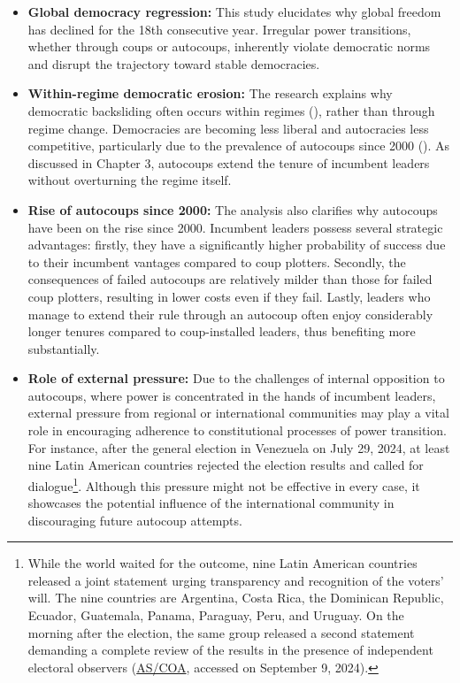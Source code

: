\documentclass[
  12pt,
]{report}
\begin{document}
\begin{itemize}
\item
  \textbf{Global democracy regression:} This study elucidates why global
  freedom has declined for the 18th consecutive year. Irregular power
  transitions, whether through coups or autocoups, inherently violate
  democratic norms and disrupt the trajectory toward stable democracies.
\item
  \textbf{Within-regime democratic erosion:} The research explains why
  democratic backsliding often occurs within regimes
  (),
  rather than through regime change. Democracies are becoming less
  liberal and autocracies less competitive, particularly due to the
  prevalence of autocoups since 2000 (). As discussed in Chapter 3, autocoups extend the tenure of
  incumbent leaders without overturning the regime itself.
\item
  \textbf{Rise of autocoups since 2000:} The analysis also clarifies why
  autocoups have been on the rise since 2000. Incumbent leaders possess
  several strategic advantages: firstly, they have a significantly
  higher probability of success due to their incumbent vantages compared
  to coup plotters. Secondly, the consequences of failed autocoups are
  relatively milder than those for failed coup plotters, resulting in
  lower costs even if they fail. Lastly, leaders who manage to extend
  their rule through an autocoup often enjoy considerably longer tenures
  compared to coup-installed leaders, thus benefiting more
  substantially.
\item
  \textbf{Role of external pressure:} Due to the challenges of internal
  opposition to autocoups, where power is concentrated in the hands of
  incumbent leaders, external pressure from regional or international
  communities may play a vital role in encouraging adherence to
  constitutional processes of power transition. For instance, after the
  general election in Venezuela on July 29, 2024, at least nine Latin
  American countries rejected the election results and called for
  dialogue\footnote{While the world waited for the outcome, nine Latin
    American countries released a joint statement urging transparency
    and recognition of the voters' will. The nine countries are
    Argentina, Costa Rica, the Dominican Republic, Ecuador, Guatemala,
    Panama, Paraguay, Peru, and Uruguay. On the morning after the
    election, the same group released a second statement demanding a
    complete review of the results in the presence of independent
    electoral observers
    (\href{https://www.as-coa.org/articles/how-have-international-leaders-responded-venezuelas-2024-election}{AS/COA},
    accessed on September 9, 2024).}. Although this pressure might not
  be effective in every case, it showcases the potential influence of
  the international community in discouraging future autocoup attempts.
\end{itemize}
\end{document}
